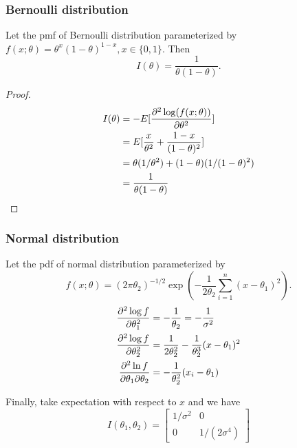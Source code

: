 \begin{refsection}
\subsubsection{Bernoulli distribution}
\begin{lemma}
	Let the pmf of Bernoulli distribution parameterized by $f(x;\theta) = \theta^x(1-\theta)^{1-x},x\in\{0,1\}$. Then
	$$I(\theta) =  \frac{1}{\theta(1-\theta)}.$$
\end{lemma}
\begin{proof}
	\begin{align*}
I(\theta) &= -E[\frac{\partial^2 \log(f(x;\theta))}{\partial \theta^2}] \\
&= E[\frac{x}{\theta^2} + \frac{1-x}{(1-\theta)^2}]\\
&= \theta (1/\theta^2) + (1-\theta)(1/(1-\theta)^2) \\
&= \frac{1}{\theta(1-\theta)}
\end{align*}
\end{proof}





\subsubsection{Normal distribution}
\begin{lemma}\cite[548]{greene2017econometric}\label{ch:theory-of-statistics:th:FishInformationMatrixForUnivariateNormalDistribution}
Let the pdf of normal distribution parameterized by $$f(x;\theta) = (2\pi\theta_2)^{-1/2}\exp(-\frac{1}{2\theta_2}\sum_{i=1}^n(x - \theta_1)^2).$$ 
	\begin{align*}
	\frac{\partial^2 \log f}{\partial \theta_1^2} &= -\frac{1}{\theta_2} = -\frac{1}{\sigma^2} \\
	\frac{\partial^2 \log f}{\partial \theta_2^2} &= \frac{1}{2\theta_2^2} - \frac{1}{\theta_2^3}(x - \theta_1)^2 \\
	\frac{\partial^2 \ln f}{\partial \theta_1\partial \theta_2} &= -\frac{1}{\theta^2_2}(x_i - \theta_1)
	\end{align*}	
	
Finally, take expectation with respect to $x$ and we have
$$I(\theta_1,\theta_2) = \begin{bmatrix}
1/\sigma^2 & 0 \\
0 & 1/(2\sigma^4)
\end{bmatrix} $$	

	
\end{lemma}




\end{refsection}
